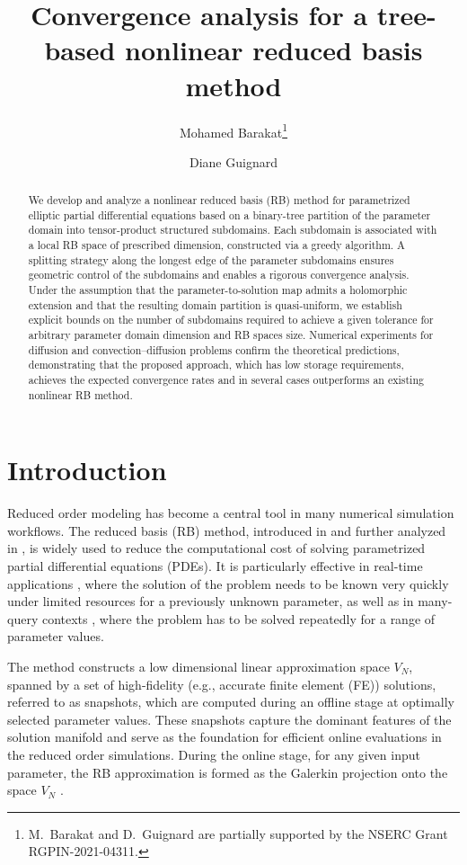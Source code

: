 \documentclass[12pt]{article}
\title{Convergence analysis for a tree-based nonlinear reduced basis method}
\author[1]{Mohamed Barakat\thanks{M.~Barakat and D.~Guignard are partially supported by the NSERC Grant RGPIN-2021-04311.}}
\author[1]{Diane Guignard }
\affil[1]{\small Department of Mathematics and Statistics, University of Ottawa, Ottawa, ON K1N 6N5, Canada}
\date{}
\theoremstyle{remark}
\theoremstyle{definition}
\numberwithin{equation}{section}
\begin{document}
\maketitle
\begin{abstract}
    We develop and analyze a nonlinear reduced basis (RB) method for parametrized elliptic partial differential equations based on a binary-tree partition of the parameter domain into tensor-product structured subdomains. Each subdomain is associated with a local RB space of prescribed dimension, constructed via a greedy algorithm. A splitting strategy along the longest edge of the parameter subdomains ensures geometric control of the subdomains and enables a rigorous convergence analysis. Under the assumption that the parameter-to-solution map admits a holomorphic extension and that the resulting domain partition is quasi-uniform, we establish explicit bounds on the number of subdomains required to achieve a given tolerance for arbitrary parameter domain dimension and RB spaces size. Numerical experiments for diffusion and convection–diffusion problems confirm the theoretical predictions, demonstrating that the proposed approach, which has low storage requirements, achieves the expected convergence rates and in several cases outperforms an existing nonlinear RB method.
\end{abstract}

\section{Introduction}
Reduced order modeling has become a central tool in many numerical simulation workflows. The reduced basis (RB) method, introduced in \cite{almroth1978automatic, noor1980reduced} and further analyzed in \cite{porsching1985estimation, rheinboldt1992theory}, is widely used to reduce the computational cost of solving parametrized partial differential equations (PDEs). It is particularly effective in real-time applications \cite{nguyen2010reduced}, where the solution of the problem needs to be known very quickly under limited resources for a previously unknown parameter, as well as in many-query contexts \cite{boyaval2008reduced,boyaval2009reduced}, where the problem has to be solved repeatedly for a range of parameter values. 

The method constructs a low dimensional linear approximation space $V_N$, spanned by a set of high-fidelity (e.g., accurate finite element (FE)) solutions, referred to as snapshots, which are computed during an offline stage at optimally selected parameter values. These snapshots capture the dominant features of the solution manifold and serve as the foundation for efficient online evaluations in the reduced order simulations. During the online stage, for any given input parameter, the RB approximation is formed as the Galerkin projection onto the space $V_N$ \cite{rozza2008reduced}. 
\end{document}
